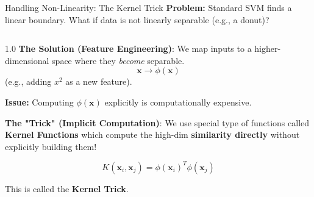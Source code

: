 \begin{frame}{Handling Non-Linearity: The Kernel Trick}
    \textbf{Problem:} Standard SVM finds a linear boundary. What if data is not linearly separable (e.g., a donut)?
    \pause
    
    \vspace{0.5em}
    \begin{columns}[c]
        \begin{column}{1.0\textwidth}
            \textbf{The Solution (Feature Engineering)}:
            We map inputs to a higher-dimensional space where they \textit{become} separable.
            $$ \mathbf{x} \rightarrow \phi(\mathbf{x}) $$
            (e.g., adding $x^2$ as a new feature).
            \pause
            \vspace{0.3em}

            \textbf{Issue:} Computing $\phi(\mathbf{x})$ explicitly is computationally expensive.
            \pause
            \vspace{0.3em}
            
            \textbf{The "Trick" (Implicit Computation)}:
             We use special type of functions called \textbf{Kernel Functions} which compute the high-dim \textbf{similarity directly} without explicitly building them!
            
            \begin{tcolorbox}[colback=blue!5, colframe=blue!60, boxsep=4pt]
                $$ K(\mathbf{x}_i, \mathbf{x}_j) = \phi(\mathbf{x}_i)^T \phi(\mathbf{x}_j) $$
            \end{tcolorbox}
            \small
            This is called the \textbf{Kernel Trick}.
        \end{column}

        
    \end{columns}
\end{frame}

